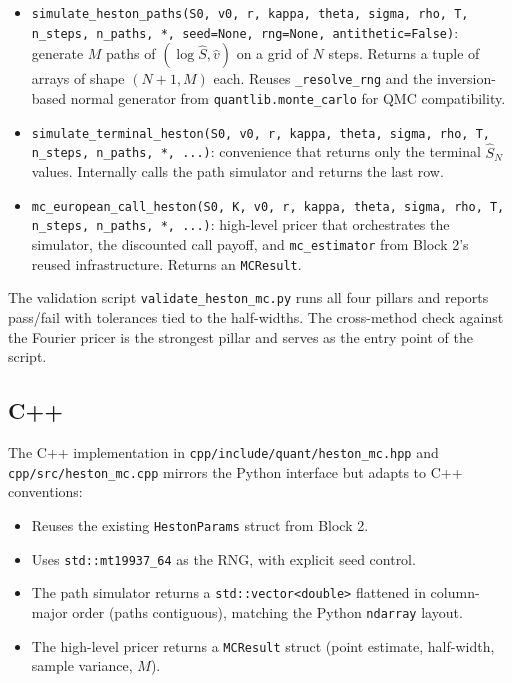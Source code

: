 \documentclass[11pt]{article}
\theoremstyle{plain}
\theoremstyle{definition}
\theoremstyle{remark}
\begin{document}
\begin{itemize}[topsep=2pt]
    \item \texttt{simulate\_heston\_paths(S0, v0, r, kappa, theta, sigma, rho, T, n\_steps, n\_paths, *, seed=None, rng=None, antithetic=False)}: generate $M$ paths of $(\log \hat S, \hat v)$ on a grid of $N$ steps. Returns a tuple of arrays of shape $(N+1, M)$ each. Reuses \texttt{\_resolve\_rng} and the inversion-based normal generator from \texttt{quantlib.monte\_carlo} for QMC compatibility.
    \item \texttt{simulate\_terminal\_heston(S0, v0, r, kappa, theta, sigma, rho, T, n\_steps, n\_paths, *, ...)}: convenience that returns only the terminal $\hat S_N$ values. Internally calls the path simulator and returns the last row.
    \item \texttt{mc\_european\_call\_heston(S0, K, v0, r, kappa, theta, sigma, rho, T, n\_steps, n\_paths, *, ...)}: high-level pricer that orchestrates the simulator, the discounted call payoff, and \texttt{mc\_estimator} from Block 2's reused infrastructure. Returns an \texttt{MCResult}.
\end{itemize}

The validation script \texttt{validate\_heston\_mc.py} runs all four pillars and reports pass/fail with tolerances tied to the half-widths. The cross-method check against the Fourier pricer is the strongest pillar and serves as the entry point of the script.

\subsection{C++}

The C++ implementation in \texttt{cpp/include/quant/heston\_mc.hpp} and \texttt{cpp/src/heston\_mc.cpp} mirrors the Python interface but adapts to C++ conventions:
\begin{itemize}[topsep=2pt]
    \item Reuses the existing \texttt{HestonParams} struct from Block 2.
    \item Uses \texttt{std::mt19937\_64} as the RNG, with explicit seed control.
    \item The path simulator returns a \texttt{std::vector<double>} flattened in column-major order (paths contiguous), matching the Python \texttt{ndarray} layout.
    \item The high-level pricer returns a \texttt{MCResult} struct (point estimate, half-width, sample variance, $M$).
\end{itemize}
\end{document}
